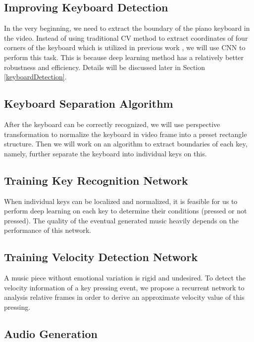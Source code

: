\documentclass[10pt,twocolumn,letterpaper]{article}
\begin{document}
\subsection{Improving Keyboard Detection}

In the very beginning, we need to extract the boundary of the piano keyboard in the video. Instead of using traditional CV method to extract coordinates of four corners of the keyboard which is utilized in previous work \cite{Akbari}, we will use CNN to perform this task. This is because deep learning method has a relatively better robustness and efficiency. Details will be discussed later in Section \ref{keyboardDetection}.

\subsection{Keyboard Separation Algorithm}

After the keyboard can be correctly recognized, we will use perspective transformation to normalize the keyboard in video frame into a preset rectangle structure. Then we will work on an algorithm to extract boundaries of each key, namely, further separate the keyboard into individual keys on this.

\subsection{Training Key Recognition Network}

When individual keys can be localized and normalized, it is feasible for us to perform deep learning on each key to determine their conditions (pressed or not pressed). The quality of the eventual generated music heavily depends on the performance of this network.

\subsection{Training Velocity Detection Network}

A music piece without emotional variation is rigid and undesired. To detect the velocity information of a key pressing event, we propose a recurrent network to analysis relative frames in order to derive an approximate velocity value of this pressing.

\subsection{Audio Generation}
\end{document}
